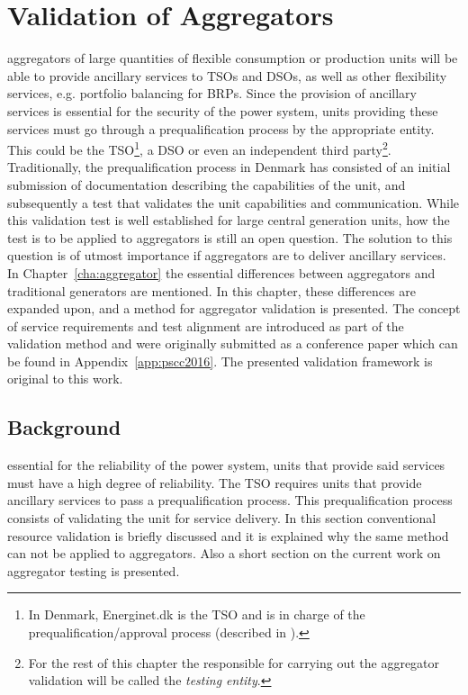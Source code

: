\chapter{Validation of Aggregators}
\label{cha:validation}
 aggregators of large quantities of flexible consumption or production units will be able to provide ancillary services to TSOs and DSOs, as well as other flexibility services, e.g. portfolio balancing for BRPs. Since the provision of ancillary services is essential for the security of the power system, units providing these services must go through a prequalification process by the appropriate entity. This could be the TSO\footnote{In Denmark, Energinet.dk is the TSO and is in charge of the prequalification/approval process (described in \cite{EnerginetAncillary}).}, a DSO or even an independent third party\footnote{For the rest of this chapter the responsible for carrying out the aggregator validation will be called the \emph{testing entity}.}. Traditionally, the prequalification process in Denmark has consisted of an initial submission of documentation describing the capabilities of the unit, and subsequently a test that validates the unit capabilities and communication. While this validation test is well established for large central generation units, how the test is to be applied to aggregators is still an open question. The solution to this question is of utmost importance if aggregators are to deliver ancillary services. In Chapter~\ref{cha:aggregator} the essential differences between aggregators and traditional generators are mentioned. In this chapter, these differences are expanded upon, and a method for aggregator validation is presented. The concept of service requirements and test alignment are introduced as part of the validation method and were originally submitted as a conference paper which can be found in Appendix~\ref{app:pscc2016}. The presented validation framework is original to this work. 

\section{Background}
 essential for the reliability of the power system, units that provide said services must have a high degree of reliability. The TSO requires units that provide ancillary services to pass a prequalification process. This prequalification process consists of validating the unit for service delivery. In this section conventional resource validation is briefly discussed and it is explained why the same method can not be applied to aggregators. Also a short section on the current work on aggregator testing is presented.
